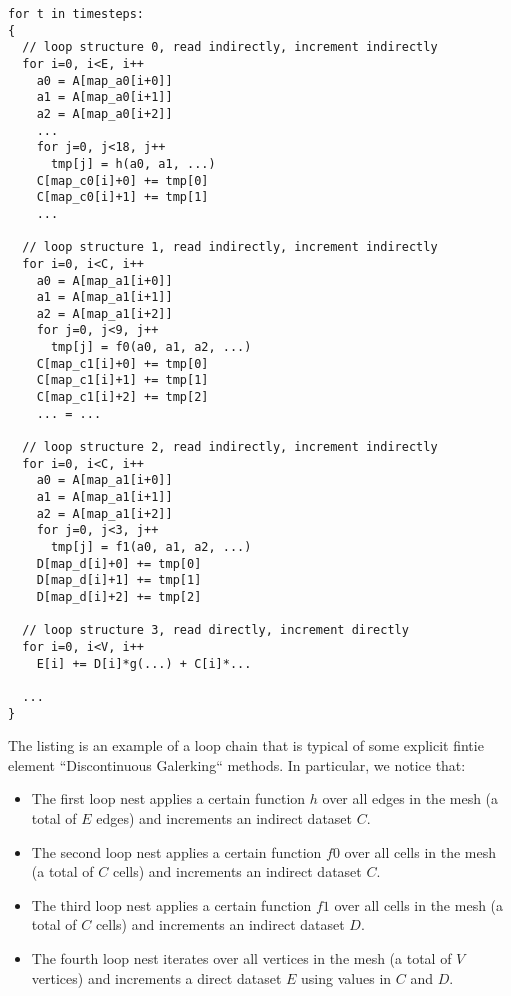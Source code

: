 \documentclass[a4paper]{article}
\begin{document}
\clearpage

\begin{footnotesize}
\begin{lstlisting}
for t in timesteps:
{
  // loop structure 0, read indirectly, increment indirectly
  for i=0, i<E, i++
    a0 = A[map_a0[i+0]]
    a1 = A[map_a0[i+1]]
    a2 = A[map_a0[i+2]]
    ...
    for j=0, j<18, j++
      tmp[j] = h(a0, a1, ...)
    C[map_c0[i]+0] += tmp[0]
    C[map_c0[i]+1] += tmp[1]
    ...

  // loop structure 1, read indirectly, increment indirectly
  for i=0, i<C, i++
    a0 = A[map_a1[i+0]]
    a1 = A[map_a1[i+1]]
    a2 = A[map_a1[i+2]]
    for j=0, j<9, j++
      tmp[j] = f0(a0, a1, a2, ...)
    C[map_c1[i]+0] += tmp[0]
    C[map_c1[i]+1] += tmp[1]
    C[map_c1[i]+2] += tmp[2]
    ... = ...

  // loop structure 2, read indirectly, increment indirectly
  for i=0, i<C, i++
    a0 = A[map_a1[i+0]]
    a1 = A[map_a1[i+1]]
    a2 = A[map_a1[i+2]]
    for j=0, j<3, j++
      tmp[j] = f1(a0, a1, a2, ...)
    D[map_d[i]+0] += tmp[0]
    D[map_d[i]+1] += tmp[1]
    D[map_d[i]+2] += tmp[2]
          
  // loop structure 3, read directly, increment directly
  for i=0, i<V, i++
    E[i] += D[i]*g(...) + C[i]*...

  ...
}
\end{lstlisting}
\end{footnotesize}

The listing is an example of a loop chain that is typical of some explicit fintie element ``Discontinuous Galerking`` methods. In particular, we notice that:
\begin{itemize}
\item The first loop nest applies a certain function $h$ over all edges in the mesh (a total of $E$ edges) and increments an indirect dataset $C$.
\item The second loop nest applies a certain function $f0$ over all cells in the mesh (a total of $C$ cells) and increments an indirect dataset $C$.
\item The third loop nest applies a certain function $f1$ over all cells in the mesh (a total of $C$ cells) and increments an indirect dataset $D$.
\item The fourth loop nest iterates over all vertices in the mesh (a total of $V$ vertices) and increments a direct dataset $E$ using values in $C$ and $D$.
\end{itemize}
\end{document}
